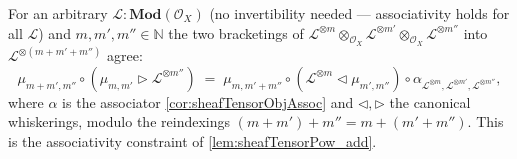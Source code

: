 \begin{lemma}

  \label{lem:tensorPowAdd_assoc}
  For an arbitrary \(\mathcal{L} : \mathbf{Mod}(\mathcal{O}_X)\) (no invertibility
  needed --- associativity holds for all \(\mathcal{L}\)) and \(m, m', m'' \in \mathbb{N}\)
  the two bracketings of
  \(\mathcal{L}^{\otimes m} \otimes_{\mathcal{O}_X} \mathcal{L}^{\otimes m'}
  \otimes_{\mathcal{O}_X} \mathcal{L}^{\otimes m''}\) into
  \(\mathcal{L}^{\otimes (m+m'+m'')}\) agree:
  \[
    \mu_{m+m', m''} \circ (\mu_{m,m'} \rhd \mathcal{L}^{\otimes m''})
      \;=\;
    \mu_{m, m'+m''} \circ (\mathcal{L}^{\otimes m} \lhd \mu_{m',m''})
      \circ \alpha_{\mathcal{L}^{\otimes m}, \mathcal{L}^{\otimes m'},
        \mathcal{L}^{\otimes m''}},
  \]
  where \(\alpha\) is the associator \cref{cor:sheafTensorObjAssoc} and \(\lhd,
  \rhd\) the canonical whiskerings, modulo the reindexings
  \((m+m')+m'' = m+(m'+m'')\). This is the associativity constraint of
  \cref{lem:sheafTensorPow_add}.
\end{lemma}

